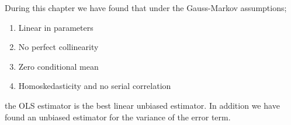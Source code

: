 During this chapter we have found that under the Gauss-Markov assumptions;
\begin{enumerate}
    \item Linear in parameters
    \item No perfect collinearity
    \item Zero conditional mean
    \item Homoskedasticity and no serial correlation
\end{enumerate}
 the OLS estimator is the best linear unbiased estimator. 
 In addition we have found an unbiased estimator for the variance of the error term.